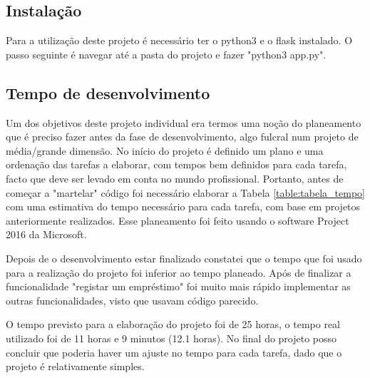 \documentclass[12pt, a4paper, twoside]{article}
\begin{document}
\subsection{Instalação}

Para a utilização deste projeto é necessário ter o python3 e o flask instalado. O passo seguinte é navegar até a pasta do projeto e fazer "python3 app.py".

\subsection{Tempo de desenvolvimento}

Um dos objetivos deste projeto individual era termos uma noção do planeamento que é preciso fazer antes da fase de desenvolvimento, algo fulcral num projeto de média/grande dimensão. No início do projeto é definido um plano e uma ordenação das tarefas a elaborar, com tempos bem definidos para cada tarefa, facto que deve ser levado em conta no mundo profissional. Portanto, antes de começar a 
"martelar" código foi necessário elaborar a Tabela \ref{table:tabela_tempo} com uma estimativa do tempo necessário para cada tarefa, com base em projetos anteriormente realizados. Esse planeamento foi feito usando o software Project 2016 da Microsoft. \par Depois de o desenvolvimento estar finalizado constatei que o tempo que foi usado para a realização do projeto foi inferior ao tempo planeado. Após de finalizar a funcionalidade "registar um empréstimo" foi muito mais rápido implementar as outras funcionalidades, visto que usavam código parecido. \par O tempo previsto para a elaboração do projeto foi de 25 horas, o tempo real utilizado foi de 11 horas e 9 minutos (12.1 horas). No final do projeto posso concluir que poderia haver um ajuste no tempo para cada tarefa, dado que o projeto é relativamente simples.

\end{document}
